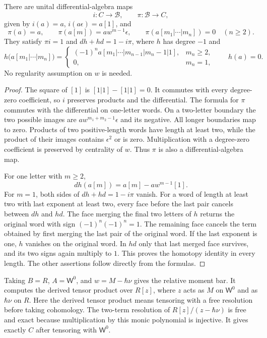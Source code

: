 \begin{proposition}\label{prop:qc-bar-contraction}
There are unital differential-algebra maps
\[
 i:C\longrightarrow\mathcal B,\qquad
 \pi:\mathcal B\longrightarrow C,
\]
given by $i(a)=a$, $i(a\epsilon)=a[1]$, and
\[
 \pi(a)=a,\qquad
 \pi(a[m])=aw^{m-1}\epsilon,\qquad
 \pi(a[m_1|\cdots|m_n])=0\quad(n\ge2).
\]
They satisfy $\pi i=1$ and $dh+hd=1-i\pi$, where $h$ has degree $-1$ and
\[
 h\bigl(a[m_1|\cdots|m_n]\bigr)=
 \begin{cases}
 (-1)^n a[m_1|\cdots|m_{n-1}|m_n-1|1],&m_n\ge2,\\
 0,&m_n=1,
 \end{cases}
 \qquad h(a)=0.
\]
No regularity assumption on $w$ is needed.
\end{proposition}
\begin{proof}
The square of $[1]$ is $[1|1]-[1|1]=0$.
It commutes with every degree-zero coefficient, so $i$ preserves products and the differential.
The formula for $\pi$ commutes with the differential on one-letter words.
On a two-letter boundary the two possible images are
$aw^{m_1+m_2-1}\epsilon$ and its negative.
All longer boundaries map to zero.
Products of two positive-length words have length at least two, while the product of their images contains $\epsilon^2$ or is zero.
Multiplication with a degree-zero coefficient is preserved by centrality of $w$.
Thus $\pi$ is also a differential-algebra map.

For one letter with $m\ge2$,
\[
 dh(a[m])=a[m]-aw^{m-1}[1].
\]
For $m=1$, both sides of $dh+hd=1-i\pi$ vanish.
For a word of length at least two with last exponent at least two, every face before the last pair cancels between $dh$ and $hd$.
The face merging the final two letters of $h$ returns the original word with sign $(-1)^n(-1)^n=1$.
The remaining face cancels the term obtained by first merging the last pair of the original word.
If the last exponent is one, $h$ vanishes on the original word.
In $hd$ only that last merged face survives, and its two signs again multiply to $1$.
This proves the homotopy identity in every length.
The other assertions follow directly from the formulas.
\end{proof}

Taking $B=R$, $A=\mathsf W^0$, and $w=M-\hbar\nu$ gives the relative moment bar.
It computes the derived tensor product over $R[z]$, where $z$ acts as $M$ on $\mathsf W^0$ and as $\hbar\nu$ on $R$.
Here the derived tensor product means tensoring with a free resolution before taking cohomology.
The two-term resolution of $R[z]/(z-\hbar\nu)$ is free and exact because multiplication by this monic polynomial is injective.
It gives exactly $C$ after tensoring with $\mathsf W^0$.

